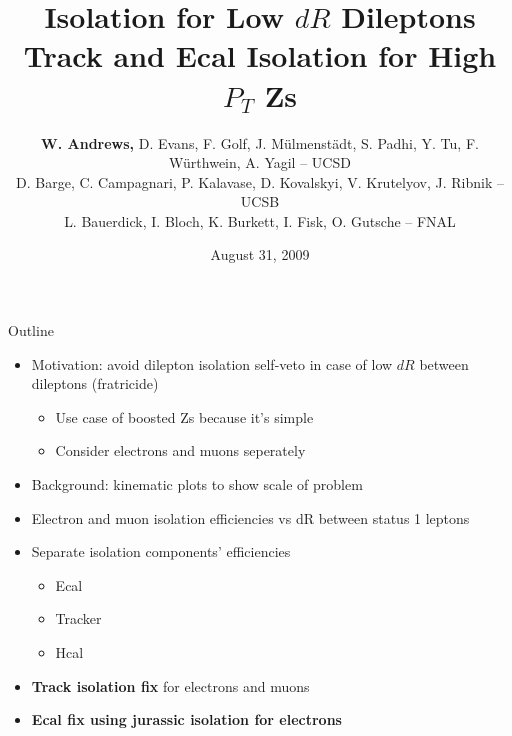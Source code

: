 \documentclass{beamer}
\title[Isolation for Low $dR$ Dileptons]{{\huge Isolation for Low $dR$ Dileptons}\\Track and Ecal Isolation for High $P_T$ Zs}
\author[Warren Andrews]{{\bf W. Andrews,} D. Evans, F. Golf, J. M\"ulmenst\"adt, S. Padhi, Y. Tu, F. W\"urthwein, A. Yagil -- UCSD\\
D. Barge, C. Campagnari, P. Kalavase, D. Kovalskyi, V. Krutelyov, J. Ribnik -- UCSB\\
L. Bauerdick, I. Bloch, K. Burkett, I. Fisk, O. Gutsche -- FNAL}
\institute[UCSD]{}
\date{August 31, 2009}
\begin{document}
\begin{frame}
\titlepage
\end{frame}


\begin{frame}{Outline}
  \begin{itemize}
  \item Motivation: avoid dilepton isolation self-veto in case of low $dR$ between dileptons (fratricide)
    \begin{itemize}
    \item Use case of boosted Zs because it's simple
    \item Consider electrons and muons seperately
    \end{itemize}
  \item Background: kinematic plots to show scale of problem
  \item Electron and muon isolation efficiencies vs dR between status 1 leptons
  \item Separate isolation components' efficiencies
    \begin{itemize}
    \item Ecal
    \item Tracker
    \item Hcal
    \end{itemize}
  \item \textbf{Track isolation fix} for electrons and muons
  \item \textbf{Ecal fix using jurassic isolation for electrons}
  \end{itemize}
\end{frame}
\end{document}
